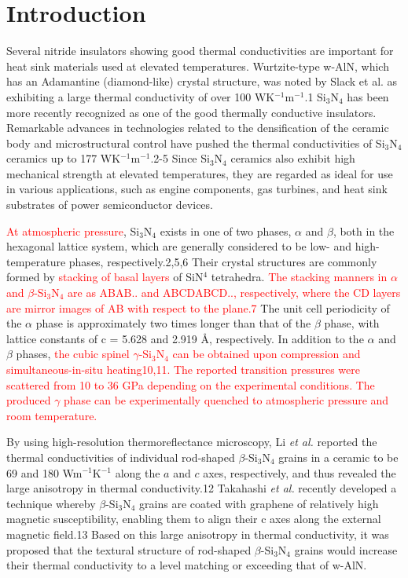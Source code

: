 \documentclass[twocolumn,amsmath,amssymb,a4paper,prb,superscriptaddress,floatfix]{revtex4-1}
\begin{document}
\maketitle

\section{Introduction}
Several nitride insulators showing good thermal conductivities are
important for heat sink materials used at elevated
temperatures. Wurtzite-type w-AlN, which has an Adamantine
(diamond-like) crystal structure, was noted by Slack et al. as
exhibiting a large thermal conductivity of over 100 WK$^{-1}$m$^{-1}$.1
Si$_3$N$_4$ has been more recently recognized as one of the good
thermally conductive insulators. Remarkable advances in technologies
related to the densification of the ceramic body and microstructural
control have pushed the thermal conductivities of Si$_3$N$_4$ ceramics
up to 177 WK$^{-1}$m$^{-1}$.2-5 Since Si$_3$N$_4$ ceramics also exhibit
high mechanical strength at elevated temperatures, they are regarded as
ideal for use in various applications, such as engine components, gas
turbines, and heat sink substrates of power semiconductor devices.

\textcolor{red}{At atmospheric pressure}, Si$_3$N$_4$ exists in one of
two phases, $\alpha$ and $\beta$, both in the hexagonal lattice system,
which are generally considered to be low- and high-temperature phases,
respectively.2,5,6 Their crystal structures are commonly formed by
%
\textcolor{red}{stacking of basal layers}
%
of SiN$^4$ tetrahedra.
%
\textcolor{red}{The stacking manners in $\alpha$ and
$\beta$-Si$_3$N$_4$ are as ABAB.. and ABCDABCD.., respectively, where
the CD layers are mirror images of AB with respect to the plane.7}
%
The unit cell periodicity of the $\alpha$ phase is approximately two
times longer than that of the $\beta$ phase, with lattice constants of c
= 5.628 and 2.919 Å, respectively. In addition to the $\alpha$ and
$\beta$ phases,
%
\textcolor{red}{the cubic spinel $\gamma$-Si$_3$N$_4$ can be obtained
upon compression and simultaneous-in-situ heating10,11. The reported
transition pressures were scattered from 10 to 36 GPa depending on the
experimental conditions. The produced $\gamma$ phase can be
experimentally quenched to atmospheric pressure and room temperature.}

By using high-resolution thermoreflectance microscopy, Li {\it et al.}
reported the thermal conductivities of individual rod-shaped
$\beta$-Si$_3$N$_4$ grains in a ceramic to be 69 and 180
Wm$^{-1}$K$^{-1}$ along the $a$ and $c$ axes, respectively, and thus
revealed the large anisotropy in thermal conductivity.12 Takahashi {\it
et al.} recently developed a technique whereby $\beta$-Si$_3$N$_4$
grains are coated with graphene of relatively high magnetic
susceptibility, enabling them to align their c axes along the external
magnetic field.13 Based on this large anisotropy in thermal
conductivity, it was proposed that the textural structure of rod-shaped
$\beta$-Si$_3$N$_4$ grains would increase their thermal conductivity to
a level matching or exceeding that of w-AlN.
\end{document}

